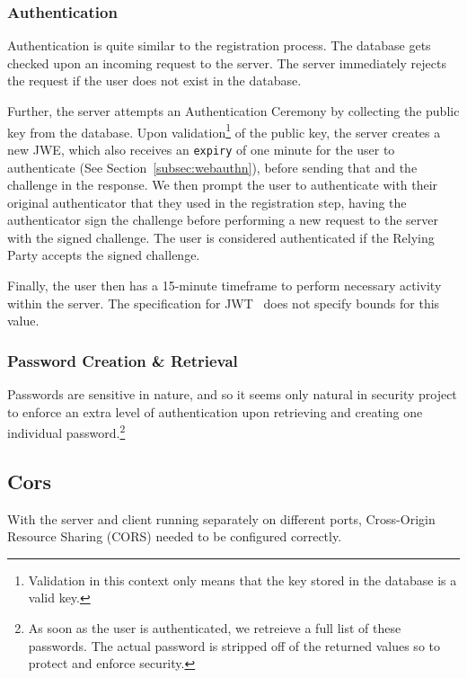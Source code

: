 \subsubsection{Authentication}
Authentication is quite similar to the registration process.
The database gets checked upon an incoming request to the server.
The server immediately rejects the request if the user does not exist in the
database.

Further, the server attempts an Authentication Ceremony by collecting the
public key from the database.
Upon validation\footnote{
  Validation in this context only means that the key stored in the database
  is a valid key.
} of the public key, the server creates a new JWE, which also receives an
\texttt{expiry} of one minute for the user to authenticate (See
Section~\ref{subsec:webauthn}), before sending that and the challenge in the
response.
We then prompt the user to authenticate with their original authenticator
that they used in the registration step, having the authenticator sign the
challenge before performing a new request to the server with the signed
challenge.
The user is considered authenticated if the Relying Party accepts the signed
challenge.

Finally, the user then has a 15-minute timeframe to perform necessary
activity within the server.
The specification for JWT~\cite{RFC7519} does not specify bounds for this value.

\subsubsection{Password Creation \& Retrieval}\label{subsubsec:creation-and-retrieval}
Passwords are sensitive in nature, and so it seems only natural in security
project to enforce an extra level of authentication upon retrieving and
creating one individual password.\footnote{
  As soon as the user is authenticated, we retreieve a full list of these
  passwords.
  The actual password is stripped off of the returned values so to protect
  and enforce security.
}

\subsection{Cors}\label{subsec:cors}
With the server and client running separately on different ports, Cross-Origin
Resource Sharing (CORS) needed to be configured correctly.

